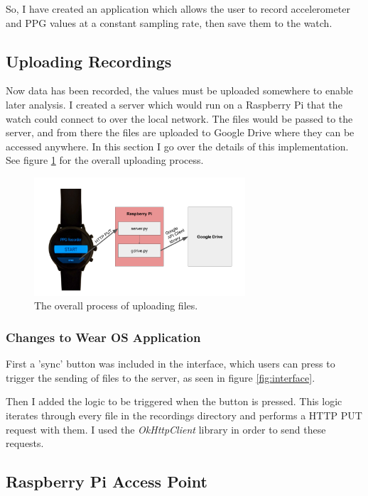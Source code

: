 \documentclass[12pt,a4paper,twoside,openright]{report}
\begin{document}
So, I have created an application which allows the user to record
accelerometer and PPG values at a constant sampling rate, then save them to
the watch.

\subsection{Uploading Recordings}

Now data has been recorded, the values must be uploaded somewhere to enable
later analysis. I created a server which would run on a Raspberry Pi that the
watch could connect to over the local network. The files would be passed to
the server, and from there the files are uploaded to Google Drive where they
can be accessed anywhere. In this section I go over the details of this
implementation. See figure \ref{fig:upload} for the overall uploading process.

\begin{figure}[tbh]
	\centerline{\includegraphics[width=0.7\textwidth]{figs/upload.png}}
	\caption{The overall process of uploading files.}
	\label{fig:upload}
\end{figure}

\subsubsection{Changes to Wear OS Application}

First a 'sync' button was included in the interface, which users can press to
trigger the sending of files to the server, as seen in figure
\ref{fig:interface}.

Then I added the logic to be triggered when the button is pressed. This logic
iterates through every file in the recordings directory and performs a HTTP
PUT request with them. I used the \emph{OkHttpClient} library in order to
send these requests.

\subsection{Raspberry Pi Access Point}
\end{document}
